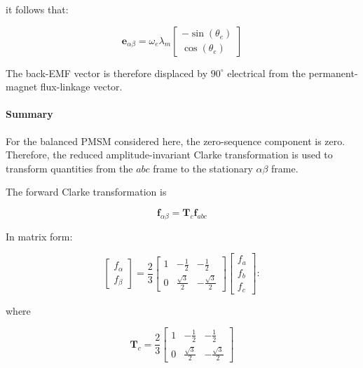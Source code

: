 \documentclass{article}
\begin{document}
it follows that:

\begin{equation}
    \mathbf{e}_{\alpha\beta}
    =
    \omega_e\lambda_m
    \begin{bmatrix}
        -\sin(\theta_e) \\
        \cos(\theta_e)
    \end{bmatrix}
\end{equation}

The back-EMF vector is therefore displaced by $90^\circ$ electrical from the permanent-magnet flux-linkage vector.


\paragraph{Summary}


For the balanced PMSM considered here, the zero-sequence component is zero.
Therefore, the reduced amplitude-invariant Clarke transformation is used to
transform quantities from the $abc$ frame to the stationary $\alpha\beta$ frame.

The forward Clarke transformation is

\begin{equation}
    \mathbf{f}_{\alpha\beta}
    =
    \mathbf{T}_c\mathbf{f}_{abc}
\end{equation}

In matrix form:

\begin{equation}
    \begin{bmatrix}
        f_\alpha \\
        f_\beta
    \end{bmatrix}
    =
    \frac{2}{3}
    \begin{bmatrix}
        1 & -\frac{1}{2} & -\frac{1}{2} \\
        0 & \frac{\sqrt{3}}{2} & -\frac{\sqrt{3}}{2}
    \end{bmatrix}
    \begin{bmatrix}
        f_a \\
        f_b \\
        f_c
    \end{bmatrix}:
\end{equation}

where

\begin{equation}
    \mathbf{T}_c
    =
    \frac{2}{3}
    \begin{bmatrix}
        1 & -\frac{1}{2} & -\frac{1}{2} \\
        0 & \frac{\sqrt{3}}{2} & -\frac{\sqrt{3}}{2}
    \end{bmatrix}
\end{equation}
\end{document}
